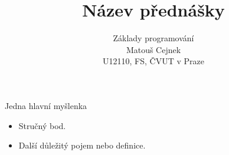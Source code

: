 \documentclass[aspectratio=169]{beamer}
\title{Název přednášky}
\subtitle{Základy programování\\Matouš Cejnek\\U12110, FS, ČVUT v Praze}
\author{}
\institute{}
\date{}
\begin{document}
\begin{frame}
  \clearpage\thispagestyle{empty}\titlepage
\end{frame}

\begin{frame}{Jedna hlavní myšlenka}
  \begin{itemize}
    \item Stručný bod.
    \item Další důležitý pojem nebo definice.
  \end{itemize}
\end{frame}
\end{document}
